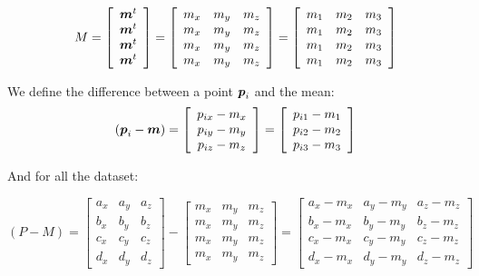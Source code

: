\documentclass{article}
\begin{document}
\[
M =
\left[\begin{array}{c}
 \mbox{\boldmath$m$}^t \\
 \mbox{\boldmath$m$}^t \\
 \mbox{\boldmath$m$}^t \\
 \mbox{\boldmath$m$}^t
\end{array}\right]
=
\left[\begin{array}{ccc}
 m_x & m_y & m_z \\
 m_x & m_y & m_z \\
 m_x & m_y & m_z \\
 m_x & m_y & m_z
\end{array}\right]
=
\left[\begin{array}{ccc}
 m_1 & m_2 & m_3 \\
 m_1 & m_2 & m_3 \\
 m_1 & m_2 & m_3 \\
 m_1 & m_2 & m_3
\end{array}\right]
\]

We define the difference between a point $\mbox{\boldmath$p$}_i$ and the mean:
\[
(\mbox{\boldmath$p$}_i - \mbox{\boldmath$m$}) =
\left[\begin{array}{c}
 p_{ix} - m_x \\
 p_{iy} - m_y \\
 p_{iz} - m_z
\end{array}\right]
=
\left[\begin{array}{c}
 p_{i1} - m_1 \\
 p_{i2} - m_2 \\
 p_{i3} - m_3
\end{array}\right]
\]

And for all the dataset:

\[
(P - M) =
\left[\begin{array}{ccc}
 a_x & a_y & a_z \\
 b_x & b_y & b_z \\
 c_x & c_y & c_z \\
 d_x & d_y & d_z
\end{array}\right]
-
\left[\begin{array}{ccc}
 m_x & m_y & m_z \\
 m_x & m_y & m_z \\
 m_x & m_y & m_z \\
 m_x & m_y & m_z
\end{array}\right]
=
\left[\begin{array}{ccc}
 a_x - m_x & a_y - m_y & a_z - m_z \\
 b_x - m_x & b_y - m_y & b_z - m_z \\
 c_x - m_x & c_y - m_y & c_z - m_z \\
 d_x - m_x & d_y - m_y & d_z - m_z
\end{array}\right]
\]
\end{document}
